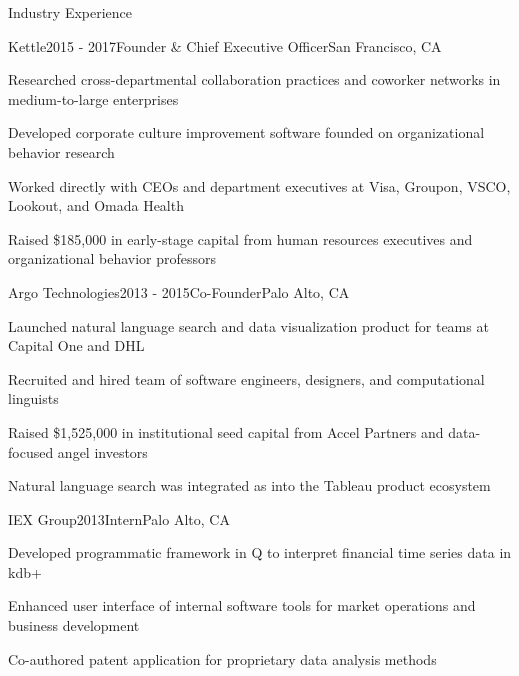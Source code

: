 \documentclass{cv} %
\begin{document}
\begin{cvSection}{Industry Experience}

\begin{cvSubsectionWork}{Kettle}{2015 - 2017}{Founder \& Chief Executive Officer}{San Francisco, CA}
\item Researched cross-departmental collaboration practices and coworker networks in medium-to-large enterprises
\item Developed corporate culture improvement software founded on organizational behavior research
\item Worked directly with CEOs and department executives at Visa, Groupon, VSCO, Lookout, and Omada Health
\item Raised \$185,000 in early-stage capital from human resources executives and organizational behavior professors
\end{cvSubsectionWork}


\begin{cvSubsectionWork}{Argo Technologies}{2013 - 2015}{Co-Founder}{Palo Alto, CA}
\item Launched natural language search and data visualization product for teams at Capital One and DHL
\item Recruited and hired team of software engineers, designers, and computational linguists
\item Raised \$1,525,000 in institutional seed capital from Accel Partners and data-focused angel investors
\item Natural language search was integrated as  into the Tableau product ecosystem 
\end{cvSubsectionWork}


\begin{cvSubsectionWork}{IEX Group}{2013}{Intern}{Palo Alto, CA}
\item Developed programmatic framework in Q to interpret financial time series data in kdb+
\item Enhanced user interface of internal software tools for market operations and business development
\item Co-authored patent application for proprietary data analysis methods
\end{cvSubsectionWork}

\end{cvSection}
\end{document}
